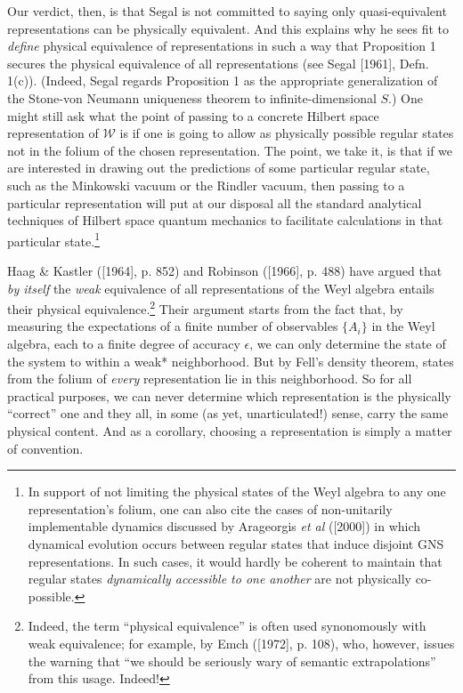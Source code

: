 \documentclass[12pt]{article}
\theoremstyle{remark}
\theoremstyle{definition}
\newcommand{\alg}[1]{\mathcal{#1}}
\begin{document}
Our verdict, then, is that Segal is not committed to saying only
quasi-equivalent representations can be physically equivalent.  And
this explains why he sees fit to \emph{define} physical equivalence of
representations in such a way that Proposition 1 secures the physical
equivalence of all representations (see Segal [1961], Defn. 1(c)).
(Indeed, Segal regards Proposition 1 as the appropriate generalization
of the Stone-von Neumann uniqueness theorem to infinite-dimensional
$S$.)  One might still ask what the point of passing to a concrete
Hilbert space representation of $\alg{W}$ is if one is going to allow
as physically possible regular states not in the folium of the chosen
representation.  The point, we take it, is that if we are interested
in drawing out the predictions of some particular regular state, such
as the Minkowski vacuum or the Rindler vacuum, then passing to a
particular representation will put at our disposal all the standard
analytical techniques of Hilbert space quantum mechanics to facilitate
calculations in that particular state.\footnote{In support of not
  limiting the physical states of the Weyl algebra to any one
  representation's folium, one can also cite the cases of
  non-unitarily implementable dynamics discussed by Arageorgis
  \emph{et al} ([2000]) in which dynamical evolution occurs between
  regular states that induce disjoint GNS representations.  In such
  cases, it would hardly be coherent to maintain that regular states
  \emph{dynamically accessible to one another} are not physically
  co-possible.}
 
Haag \& Kastler ([1964], p. 852) and Robinson ([1966], p.  488) have
argued that \emph{by itself} the \emph{weak} equivalence of all
representations of the Weyl algebra entails their physical
equivalence.\footnote{Indeed, the term ``physical equivalence'' is
  often used synonomously with weak equivalence; for example, by Emch
  ([1972], p. 108), who, however, issues the warning that ``we should
  be seriously wary of semantic extrapolations'' from this usage.
  Indeed!}  Their argument starts from the fact that, by measuring the
expectations of a finite number of observables $\{A_{i}\}$ in the Weyl
algebra, each to a finite degree of accuracy $\epsilon$, we can only
determine the state of the system to within a weak* neighborhood. But
by Fell's density theorem, states from the folium of \emph{every}
representation lie in this neighborhood.  So for all practical
purposes, we can never determine which representation is the
physically ``correct'' one and they all, in some (as yet,
unarticulated!) sense, carry the same physical content.  And as a
corollary, choosing a representation is simply a matter of convention.
 
\end{document}
